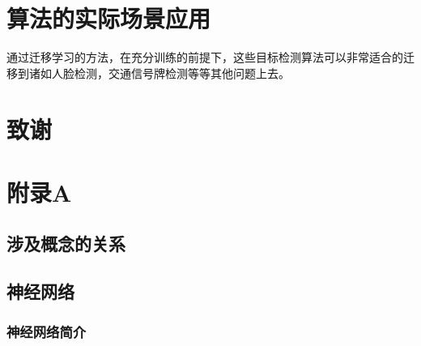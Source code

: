 \documentclass[12pt,a4paper,titlepage]{article}
\begin{document}
\section{算法的实际场景应用}
通过迁移学习的方法，在充分训练的前提下，这些目标检测算法可以非常适合的迁移到诸如人脸检测，交通信号牌检测等等其他问题上去。

\section*{致谢}


\newpage
\renewcommand\refname{\zihao{-2} 参考文献}


\newpage
\section*{附录A}

\subsection*{涉及概念的关系}


\subsection*{神经网络}
\subsubsection*{神经网络简介}
\end{document}
